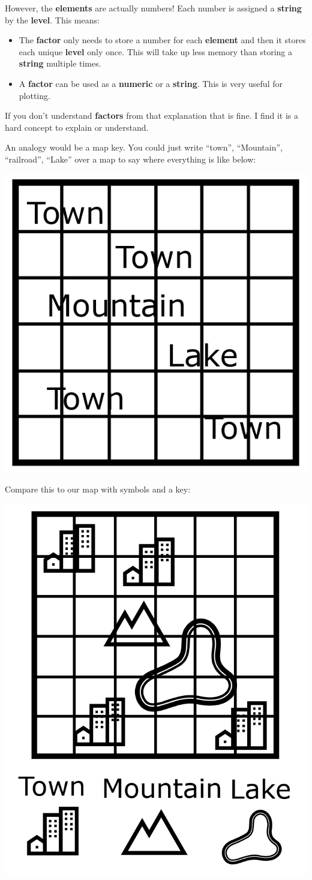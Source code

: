 \documentclass[]{book}
\providecommand{\tightlist}{%
  \setlength{\itemsep}{0pt}\setlength{\parskip}{0pt}}
\begin{document}
However, the \textbf{elements} are actually numbers! Each number is
assigned a \textbf{string} by the \textbf{level}. This means:

\begin{itemize}
\tightlist
\item
  The \textbf{factor} only needs to store a number for each
  \textbf{element} and then it stores each unique \textbf{level} only
  once. This will take up less memory than storing a \textbf{string}
  multiple times.
\item
  A \textbf{factor} can be used as a \textbf{numeric} or a
  \textbf{string}. This is very useful for plotting.
\end{itemize}

If you don't understand \textbf{factors} from that explanation that is
fine. I find it is a hard concept to explain or understand.

An analogy would be a map key. You could just write ``town'',
``Mountain'', ``railroad'', ``Lake'' over a map to say where everything
is like below:

\begin{center}\includegraphics[width=0.4\linewidth]{figures/town_words} \end{center}

Compare this to our map with symbols and a key:

\begin{center}\includegraphics[width=0.4\linewidth]{figures/town_symbols} \end{center}
\end{document}
